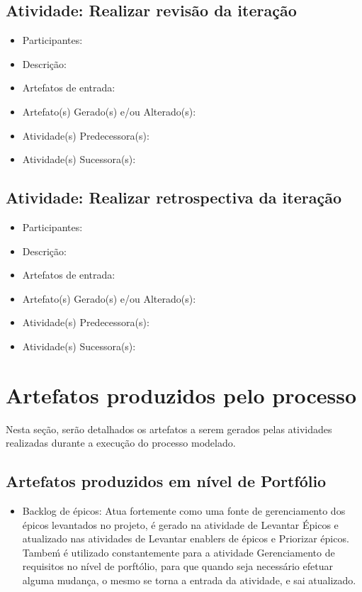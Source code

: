 \subsection{Atividade: Realizar revisão da iteração}
\begin{itemize}
\item Participantes: 

\item Descrição: 

\item Artefatos de entrada: 

\item Artefato(s) Gerado(s) e/ou Alterado(s): 

\item Atividade(s) Predecessora(s): 
  
\item Atividade(s) Sucessora(s): 
\end{itemize}

\subsection{Atividade: Realizar retrospectiva da iteração}
\begin{itemize}
\item Participantes: 

\item Descrição: 

\item Artefatos de entrada: 

\item Artefato(s) Gerado(s) e/ou Alterado(s): 

\item Atividade(s) Predecessora(s): 
  
\item Atividade(s) Sucessora(s): 
\end{itemize}

\section{Artefatos produzidos pelo processo}

Nesta seção, serão detalhados os artefatos a serem gerados pelas atividades realizadas durante 
a execução do processo modelado.
\subsection{Artefatos produzidos em nível de Portfólio}
\begin{itemize}
\item Backlog de épicos: Atua fortemente como uma fonte de gerenciamento dos épicos levantados no projeto, é gerado na atividade de Levantar Épicos e atualizado nas atividades de Levantar enablers de épicos e Priorizar épicos. Tambeḿ é utilizado constantemente para a atividade Gerenciamento de requisitos no nível de porftólio, para que quando seja necessário efetuar alguma mudança, o mesmo se torna a entrada da atividade, e sai atualizado.
\end{itemize}


